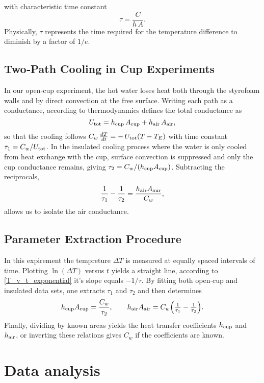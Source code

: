 \documentclass[12pt,a4paper]{report}
\begin{document}
with characteristic time constant
\[
\tau = \frac{C}{h\,A}.
\]
Physically, $\tau$ represents the time required for the temperature difference to diminish by a factor of $1/e$.

\subsection{Two‐Path Cooling in Cup Experiments}
In our open‐cup experiment, the hot water loses heat both through the styrofoam walls and by direct convection at the free surface. Writing each path as a conductance, according to thermodynamics defines the total conductance as
\[
U_{\rm tot} = h_{\rm cup}\,A_{\rm cup} + h_{\rm air}\,A_{\rm air},
\]
so that the cooling follows $C_w\,\frac{dT}{dt} = -\,U_{\rm tot}(T-T_E)$ with time constant $\tau_1=C_w/U_{\rm tot}$. In the insulated cooling process where the water is only cooled from heat exchange with the cup, surface convection is suppressed and only the cup conductance remains, giving $\tau_2=C_w/(h_{\rm cup}A_{\rm cup})$. Subtracting the reciprocals,
\[
\frac1{\tau_1} - \frac1{\tau_2} = \frac{h_{\rm air}A_{\rm aur}}{C_w},
\]
allows us to isolate the air conductance.

\subsection{Parameter Extraction Procedure}
 In this expirement the tempreture $\Delta T$ is measured at equally spaced intervals of time. Plotting $\ln(\Delta T )$ versus $t$ yields a straight line, according to \eqref{T_v_t_exponential} it's slope equals $-1/\tau$. By fitting both open‐cup and insulated data sets, one extracts $\tau_1$ and $\tau_2$ and then determines
\[
h_{\rm cup}A_{\rm cup} = \frac{C_w}{\tau_2},\qquad
h_{\rm air}A_{\rm air} = C_w\Bigl(\tfrac1{\tau_1}-\tfrac1{\tau_2}\Bigr).
\]
Finally, dividing by known areas yields the heat transfer coefficients $h_{\rm cup}$ and $h_{\rm air}$, or inverting these relations gives $C_w$ if the coefficients are known.

\section{Data analysis}
\end{document}
